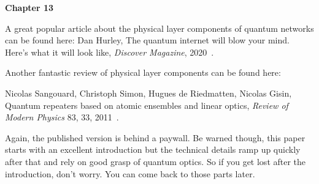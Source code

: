{\bf Chapter 13}

A great popular article about the physical layer components of quantum networks can be found here:
Dan Hurley, The quantum internet will blow your mind. Here’s what it will look like, \emph{Discover Magazine}, 2020~\cite{hurley2020quantum}.

Another fantastic review of physical layer components can be found here:

Nicolas Sangouard, Christoph Simon, Hugues de Riedmatten, Nicolas Gisin, Quantum repeaters based on atomic ensembles and linear optics, \emph{Review of Modern Physics} 83, 33, 2011~\cite{sangouard2011quantum}.

Again, the published version is behind a paywall. Be warned though, this paper starts with an excellent introduction but the technical details ramp up quickly after that and rely on good grasp of quantum optics. So if you get lost after the introduction, don’t worry. You can come back to those parts later.
